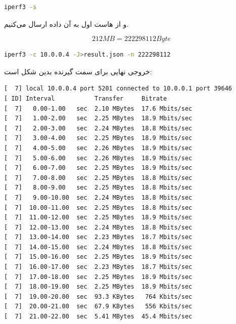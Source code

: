 \documentclass[12pt]{article}
\begin{document}
\begin{enumerate}
\begin{latin}
	\begin{lstlisting}[language=bash]
		iperf3 -s
	\end{lstlisting}
\end{latin}

و از هاست اول به آن داده ارسال می‌کنیم.

$$212 MB = 222298112 Byte$$


\begin{latin}
	\begin{lstlisting}[language=bash]
		 iperf3 -c 10.0.0.4 -J>result.json -n 222298112 
	\end{lstlisting}
\end{latin}

خروجی نهایی برای سمت گیرنده بدین شکل است:

\begin{latin}
\begin{Verbatim}
[  7] local 10.0.0.4 port 5201 connected to 10.0.0.1 port 39646
[ ID] Interval           Transfer     Bitrate
[  7]   0.00-1.00   sec  2.10 MBytes  17.6 Mbits/sec                  
[  7]   1.00-2.00   sec  2.25 MBytes  18.9 Mbits/sec                  
[  7]   2.00-3.00   sec  2.24 MBytes  18.8 Mbits/sec                  
[  7]   3.00-4.00   sec  2.25 MBytes  18.9 Mbits/sec                  
[  7]   4.00-5.00   sec  2.26 MBytes  18.9 Mbits/sec                  
[  7]   5.00-6.00   sec  2.26 MBytes  18.9 Mbits/sec                  
[  7]   6.00-7.00   sec  2.25 MBytes  18.9 Mbits/sec                  
[  7]   7.00-8.00   sec  2.25 MBytes  18.8 Mbits/sec                  
[  7]   8.00-9.00   sec  2.25 MBytes  18.8 Mbits/sec                  
[  7]   9.00-10.00  sec  2.24 MBytes  18.8 Mbits/sec                  
[  7]  10.00-11.00  sec  2.25 MBytes  18.8 Mbits/sec                  
[  7]  11.00-12.00  sec  2.25 MBytes  18.9 Mbits/sec                  
[  7]  12.00-13.00  sec  2.24 MBytes  18.8 Mbits/sec                  
[  7]  13.00-14.00  sec  2.23 MBytes  18.7 Mbits/sec                  
[  7]  14.00-15.00  sec  2.24 MBytes  18.8 Mbits/sec                  
[  7]  15.00-16.00  sec  2.25 MBytes  18.9 Mbits/sec                  
[  7]  16.00-17.00  sec  2.23 MBytes  18.7 Mbits/sec                  
[  7]  17.00-18.00  sec  2.25 MBytes  18.9 Mbits/sec                  
[  7]  18.00-19.00  sec  2.25 MBytes  18.9 Mbits/sec                  
[  7]  19.00-20.00  sec  93.3 KBytes   764 Kbits/sec                  
[  7]  20.00-21.00  sec  67.9 KBytes   556 Kbits/sec                  
[  7]  21.00-22.00  sec  5.41 MBytes  45.4 Mbits/sec                  

\end{Verbatim}
\end{latin}
\end{enumerate}
\end{document}
